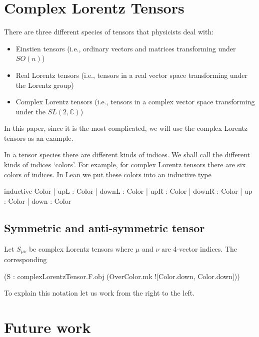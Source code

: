 \documentclass[a4paper, 11pt]{article}
\begin{document}
\section{Complex Lorentz Tensors}
There are three different species of tensors that physicists deal with: 
\begin{itemize} 
  \item Einstien tensors (i.e., ordinary vectors and matrices transforming under $SO(n)$)
  \item Real Lorentz tensors (i.e., tensors in a real vector space transforming under the Lorentz group)
  \item Complex Lorentz tensors (i.e., tensors in a complex vector space transforming under the $SL(2,\mathbb{C})$)
\end{itemize} 
In this paper, since it is the most complicated, we will use the complex Lorentz tensors as an example.

In a tensor species there are different kinds of indices. We shall call the different 
kinds of indices `colors'. For example, for complex Lorentz tensors there are six colors of indices.
In Lean we put these colors into an inductive type 
\begin{code}
inductive Color
  | upL : Color
  | downL : Color
  | upR : Color
  | downR : Color
  | up : Color
  | down : Color
\end{code}


\subsection{Symmetric and anti-symmetric tensor}

Let  $S_{\mu \nu}$ be complex Lorentz tensors where $\mu$ and $\nu$ are 
4-vector indices. The corresponding 
\begin{code}
(S : complexLorentzTensor.F.obj (OverColor.mk ![Color.down, Color.down]))
\end{code}

To explain this notation let us work from the right to the left.



\section{Future work}


\begin{spacing}{0.5}

\end{spacing}


\end{document}
